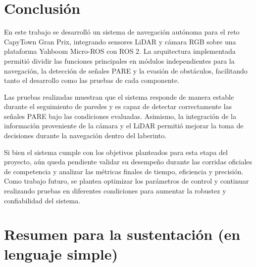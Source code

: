 \documentclass[conference]{IEEEtran}
\begin{document}
\section{Conclusión}

En este trabajo se desarrolló un sistema de navegación autónoma para el reto CapyTown Gran Prix, integrando sensores LiDAR y cámara RGB sobre una plataforma Yahboom Micro-ROS con ROS 2. La arquitectura implementada permitió dividir las funciones principales en módulos independientes para la navegación, la detección de señales PARE y la evasión de obstáculos, facilitando tanto el desarrollo como las pruebas de cada componente.

Las pruebas realizadas muestran que el sistema responde de manera estable durante el seguimiento de paredes y es capaz de detectar correctamente las señales PARE bajo las condiciones evaluadas. Asimismo, la integración de la información proveniente de la cámara y el LiDAR permitió mejorar la toma de decisiones durante la navegación dentro del laberinto.

Si bien el sistema cumple con los objetivos planteados para esta etapa del proyecto, aún queda pendiente validar su desempeño durante las corridas oficiales de competencia y analizar las métricas finales de tiempo, eficiencia y precisión. Como trabajo futuro, se plantea optimizar los parámetros de control y continuar realizando pruebas en diferentes condiciones para aumentar la robustez y confiabilidad del sistema.

\section*{Resumen para la sustentación (en lenguaje simple)}
\end{document}
